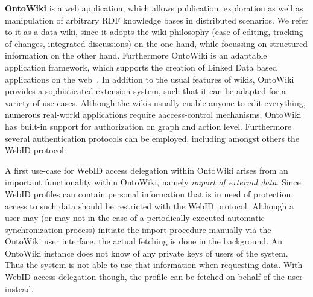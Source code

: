 \documentclass[a4paper]{llncs}
\begin{document}
\textbf{OntoWiki}
\cite{auer-s-2006-736-a} is a web application, which allows publication, exploration as well as manipulation of arbitrary RDF knowledge bases in distributed scenarios.
We refer to it as a data wiki, since it adopts the wiki philosophy (ease of editing, tracking of changes, integrated discussions) on the one hand, while focussing on structured information on the other hand.
Furthermore OntoWiki is an adaptable application framework, which supports the creation of Linked Data based applications on the web~\cite{heino-n-2009-61-a}.
In addition to the usual features of wikis, OntoWiki provides a sophisticated extension system, such that it can be adapted for a variety of use-cases.
Although the wikis usually enable anyone to edit everything, numerous real-world applications require aaccess-control mechanisms.
OntoWiki has built-in support for authorization on graph and action level.
Furthermore several authentication protocols can be employed, including amongst others the WebID protocol.


A first use-case for WebID access delegation within OntoWiki arises from an important functionality within OntoWiki, namely \textit{import of external data}.
Since WebID profiles can contain personal information that is in need of protection, access to such data should be restricted with the WebID protocol.
Although a user may (or may not in the case of a periodically executed automatic synchronization process) initiate the import procedure manually via the OntoWiki user interface, the actual fetching is done in the background.
An OntoWiki instance does not know of any private keys of users of the system.
Thus the system is not able to use that information when requesting data.
With WebID access delegation though, the profile can be fetched on behalf of the user instead.
\end{document}
